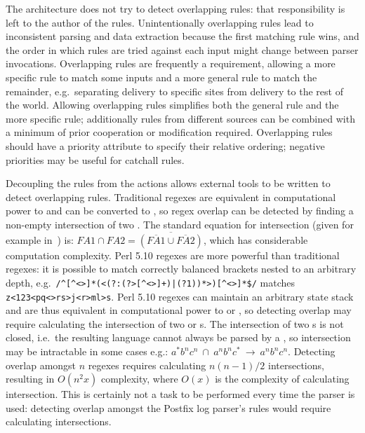 The architecture does not try to detect overlapping rules: that
responsibility is left to the author of the rules.  Unintentionally
overlapping rules lead to inconsistent parsing and data extraction because
the first matching rule wins, and the order in which rules are tried
against each input might change between parser invocations.  Overlapping
rules are frequently a requirement, allowing a more specific rule to match
some inputs and a more general rule to match the remainder, e.g.\
separating  delivery to specific sites from 
delivery to the rest of the world.  Allowing overlapping rules simplifies
both the general rule and the more specific rule; additionally rules from
different sources can be combined with a minimum of prior cooperation or
modification required.  Overlapping rules should have a priority attribute
to specify their relative ordering; negative priorities may be useful for
catchall rules.

Decoupling the rules from the actions allows external tools to be written
to detect overlapping rules.  Traditional regexes are equivalent in
computational power to  and can be converted to ,
so regex overlap can be detected by finding a non-empty intersection of two
\@.  The standard equation for \acronym{FA} intersection (given
for example in~\cite{intersection-of-NFA-using-Z}) is: $FA1 \cap{} FA2 =
\overline{(\overline{FA1} \cup{} \overline{FA2})}$, which has considerable
computation complexity.  Perl 5.10 regexes are more powerful than
traditional regexes: it is possible to match correctly balanced brackets
nested to an arbitrary depth, e.g.\
\verb!/^[^<>]*(<(?:(?>[^<>]+)|(?1))*>)[^<>]*$/! matches
\verb!z<123<pq<>rs>j<r>ml>s!.  Perl 5.10 regexes can maintain an arbitrary
state stack and are thus equivalent in computational power to 
or , so detecting overlap may require calculating the
intersection of two \acronym{PDA} or s.  The intersection of
two \acronym{CFL}s is not closed, i.e.\ the resulting language cannot
always be parsed by a \acronym{CFL}, so intersection may be intractable in
some cases e.g.:
$a^{*}b^{n}c^{n}~\cap~a^{n}b^{n}c^{*}~\rightarrow~a^{n}b^{n}c^{n}$.
Detecting overlap amongst $n$ regexes requires calculating $n(n-1)/2$
intersections, resulting in $O(n^2x)$ complexity, where $O(x)$ is the
complexity of calculating intersection.  This is certainly not a task to be
performed every time the parser is used: detecting overlap amongst the
Postfix log parser's \numberOFrules{} rules would require calculating
\numberOFruleINTERSECTIONS{} intersections.

